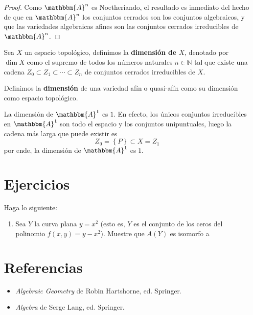\documentclass[12pt]{report}
\newcounter{it}
\theoremstyle{largebreak}
\newcommand{\bbm}[1]{\ensuremath{\mathbbm{#1}}}
\begin{document}
    \begin{proof}
        Como $\bbm{A}^n$ es Noetheriando, el resultado es inmediato del hecho de que en $\bbm{A}^n$ los conjuntos cerrados son los conjuntos algebraicos, y que las variedades algebraicas afines son las conjuntos cerrados irreducibles de $\bbm{A}^n$.
    \end{proof}

    \begin{mydef}
        Sea $X$ un espacio topológico, definimos la \textbf{dimensión de $X$}, denotado por $\dim X$ como el supremo de todos los números naturales $n\in\mathbb{N}$ tal que existe una cadena $Z_0\subset Z_1\subset\cdots\subset Z_n$ de conjuntos cerrados irreducibles de $X$.

        Definimos la \textbf{dimensión} de una variedad afín o quasi-afín como su dimensión como espacio topológico.
    \end{mydef}

    \begin{exa}
        La dimensión de $\bbm{A}^1$ es $1$. En efecto, los únicos conjuntos irreducibles en $\bbm{A}^1$ son todo el espacio y los conjuntos unipuntuales, luego la cadena más larga que puede existir es
        \begin{equation*}
            Z_0=\left\{P \right\}\subset X=Z_1
        \end{equation*}
        por ende, la dimensión de $\bbm{A}^1$ es $1$.
    \end{exa}

    \newpage

    \section{Ejercicios}

    \begin{excer}
        Haga lo siguiente:
        \begin{enumerate}[label=(\textit{\alph*})]
            \item Sea $Y$ la curva plana $y=x^2$ (esto es, $Y$ es el conjunto de los ceros del polinomio $f(x,y)=y-x^2$). Muestre que $A(Y)$ es isomorfo a 
        \end{enumerate}
    \end{excer}

    \newpage

    \section{Referencias}

    \begin{itemize}
        \item \textit{Algebraic Geometry} de Robin Hartshorne, ed. Springer.
        \item \textit{Algebra} de Serge Lang, ed. Springer.
    \end{itemize}
\end{document}
